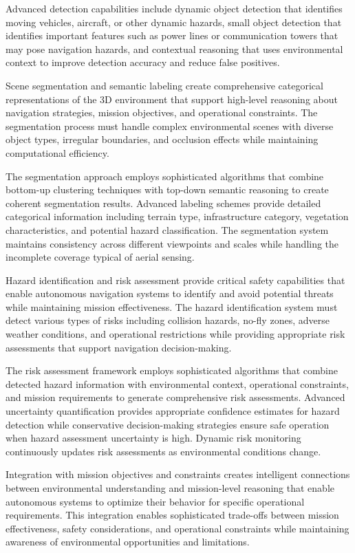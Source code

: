 Advanced detection capabilities include dynamic object detection that identifies moving vehicles, aircraft, or other dynamic hazards, small object detection that identifies important features such as power lines or communication towers that may pose navigation hazards, and contextual reasoning that uses environmental context to improve detection accuracy and reduce false positives.

Scene segmentation and semantic labeling create comprehensive categorical representations of the 3D environment that support high-level reasoning about navigation strategies, mission objectives, and operational constraints. The segmentation process must handle complex environmental scenes with diverse object types, irregular boundaries, and occlusion effects while maintaining computational efficiency.

The segmentation approach employs sophisticated algorithms that combine bottom-up clustering techniques with top-down semantic reasoning to create coherent segmentation results. Advanced labeling schemes provide detailed categorical information including terrain type, infrastructure category, vegetation characteristics, and potential hazard classification. The segmentation system maintains consistency across different viewpoints and scales while handling the incomplete coverage typical of aerial sensing.

Hazard identification and risk assessment provide critical safety capabilities that enable autonomous navigation systems to identify and avoid potential threats while maintaining mission effectiveness. The hazard identification system must detect various types of risks including collision hazards, no-fly zones, adverse weather conditions, and operational restrictions while providing appropriate risk assessments that support navigation decision-making.

The risk assessment framework employs sophisticated algorithms that combine detected hazard information with environmental context, operational constraints, and mission requirements to generate comprehensive risk assessments. Advanced uncertainty quantification provides appropriate confidence estimates for hazard detection while conservative decision-making strategies ensure safe operation when hazard assessment uncertainty is high. Dynamic risk monitoring continuously updates risk assessments as environmental conditions change.

Integration with mission objectives and constraints creates intelligent connections between environmental understanding and mission-level reasoning that enable autonomous systems to optimize their behavior for specific operational requirements. This integration enables sophisticated trade-offs between mission effectiveness, safety considerations, and operational constraints while maintaining awareness of environmental opportunities and limitations.


